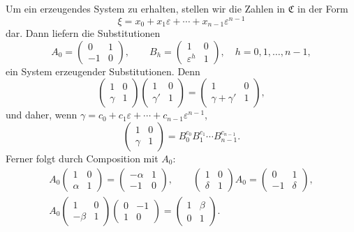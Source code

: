 \documentclass[11pt]{article}
\begin{document}
Um ein erzeugendes System zu erhalten, stellen wir die Zahlen in $\mathfrak C$ in der Form
\begin{equation}
 \xi=x_0+x_1\varepsilon+\cdots+x_{n-1}\varepsilon^{n-1} \tag{7}
\end{equation}
dar. Dann liefern die Substitutionen
\begin{equation}
 A_0=\begin{pmatrix}0&1\\-1&0\end{pmatrix},\qquad
 B_h=\begin{pmatrix}1&0\\\varepsilon^h&1\end{pmatrix},
 \quad h=0,1,\ldots,n-1, \tag{8}
\end{equation}
ein System erzeugender Substitutionen. Denn
\[
 \begin{pmatrix}1&0\\ \gamma&1\end{pmatrix}
 \begin{pmatrix}1&0\\ \gamma'&1\end{pmatrix}
 =
 \begin{pmatrix}1&0\\ \gamma+\gamma'&1\end{pmatrix},
\]
und daher, wenn $\gamma=c_0+c_1\varepsilon+\cdots+c_{n-1}\varepsilon^{n-1}$,
\begin{equation}
 \begin{pmatrix}1&0\\ \gamma&1\end{pmatrix}
 =B_0^{c_0}B_1^{c_1}\cdots B_{n-1}^{c_{n-1}}. \tag{9}
\end{equation}
Ferner folgt durch Composition mit $A_0$:
\begin{equation}
\begin{gathered}
 A_0\begin{pmatrix}1&0\\ \alpha&1\end{pmatrix}
 =\begin{pmatrix}-\alpha&1\\-1&0\end{pmatrix},\qquad
 \begin{pmatrix}1&0\\ \delta&1\end{pmatrix}A_0
 =\begin{pmatrix}0&1\\-1&\delta\end{pmatrix},\\
 A_0\begin{pmatrix}1&0\\ -\beta&1\end{pmatrix}
 \begin{pmatrix}0&-1\\1&0\end{pmatrix}
 =\begin{pmatrix}1&\beta\\0&1\end{pmatrix}.
\end{gathered} \tag{10}
\end{equation}
\end{document}
